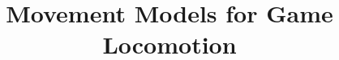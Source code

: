 \documentclass[format=acmtog]{acmart}
\begin{document}
\title{Movement Models for Game Locomotion}









\maketitle

\end{document}
